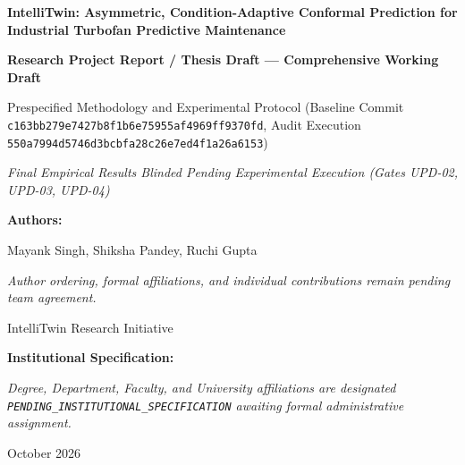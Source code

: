 \documentclass[12pt,a4paper,oneside]{report}
\begin{document}
\begin{titlepage}
\centering
\vspace*{1.5cm}

{\Huge \bfseries IntelliTwin: Asymmetric, Condition-Adaptive Conformal Prediction for Industrial Turbofan Predictive Maintenance\par}

\vspace{1.5cm}
{\Large \bfseries Research Project Report / Thesis Draft — Comprehensive Working Draft\par}
\vspace{0.5cm}
{\large Prespecified Methodology and Experimental Protocol (Baseline Commit \texttt{c163bb279e7427b8f1b6e75955af4969ff9370fd}, Audit Execution \texttt{550a7994d5746d3bcbfa28c26e7ed4f1a26a6153})\par}
\vspace{0.3cm}
{\itshape Final Empirical Results Blinded Pending Experimental Execution (Gates UPD-02, UPD-03, UPD-04)\par}

\vspace{2.0cm}
{\large \textbf{Authors:}\par}
\vspace{0.3cm}
{\Large Mayank Singh, Shiksha Pandey, Ruchi Gupta\par}
\vspace{0.3cm}
{\itshape Author ordering, formal affiliations, and individual contributions remain pending team agreement.\par}
\vspace{0.3cm}
{\large IntelliTwin Research Initiative\par}

\vspace{2.0cm}
{\large \textbf{Institutional Specification:}\par}
\vspace{0.2cm}
{\itshape Degree, Department, Faculty, and University affiliations are designated \texttt{PENDING\_INSTITUTIONAL\_SPECIFICATION} awaiting formal administrative assignment.\par}

\vfill
{\large October 2026\par}
\end{titlepage}

\setcounter{page}{2}
\end{document}
